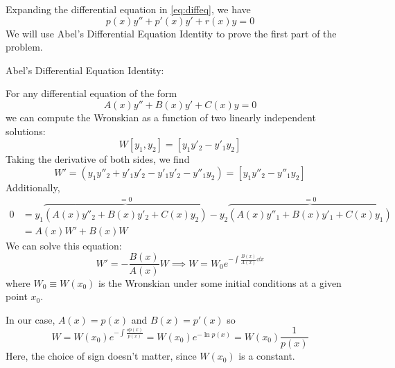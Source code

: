 \documentclass[a4paper,twoside]{article}
\begin{document}
\hr

\begin{tcolorbox}[breakable]
    Expanding the differential equation in \ref{eq:diffeq}, we have
    \begin{equation}
        p(x) y'' + p'(x) y' + r(x) y = 0
    \end{equation}
    We will use Abel's Differential Equation Identity to prove the first part of the problem.
    \begin{theorem}
        Abel's Differential Equation Identity:
        
        For any differential equation of the form
        \begin{equation}
            A(x) y'' + B(x) y' + C(x) y = 0
        \end{equation}
        we can compute the Wronskian as a function of two linearly independent solutions:
        \begin{equation}
            W[y_1,y_2] = [y_1y'_2 - y'_1y_2]
        \end{equation}
        Taking the derivative of both sides, we find
        \begin{equation}
            W' = (y_1y''_2 + y'_1y'_2 - y'_1y'_2 - y''_1y_2) = [y_1y''_2 - y''_1y_2]
        \end{equation}
        Additionally,
        \begin{align}
            0 &= y_1 \overbrace{\left( A(x)y''_2 + B(x) y'_2 + C(x) y_2 \right)}^{=0} - y_2 \overbrace{\left( A(x)y''_1 + B(x)y'_1 + C(x)y_1 \right)}^{=0}\\
            &= A(x) W' + B(x) W
        \end{align}
        We can solve this equation:
        \begin{equation}
            W' = - \frac{B(x)}{A(x)} W \implies W = W_0 e^{-\int \frac{B(x)}{A(x)} \dd{x}}
        \end{equation}
        where $ W_0\equiv W(x_0) $ is the Wronskian under some initial conditions at a given point $ x_0 $.
    \end{theorem}

    In our case, $ A(x) = p(x) $ and $ B(x) = p'(x) $ so
    \begin{equation}
        W = W(x_0) e^{- \int \frac{\dd{p(x)}}{p(x)}} = W(x_0) e^{-\ln{p(x)}} = W(x_0) \frac{1}{p(x)}
    \end{equation}
    Here, the choice of sign doesn't matter, since $ W(x_0) $ is a constant.


\end{tcolorbox}
\end{document}
